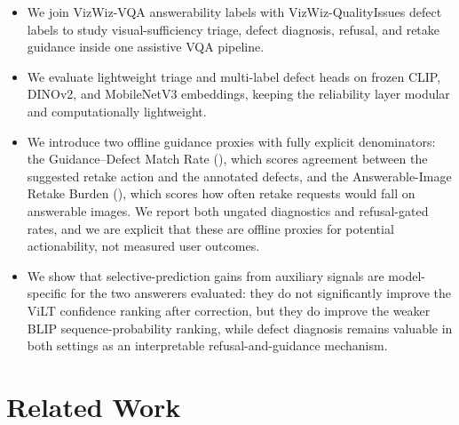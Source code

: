 \documentclass{ieeeaccess}
\newcommand{\arr}{\mathrm{GDMR}}
\newcommand{\frr}{\mathrm{AIRB}}
\newcommand{\clip}{CLIP}
\newcommand{\dinov}{DINOv2}
\newcommand{\mobilenet}{MobileNetV3}
\newcommand{\vilt}{ViLT}
\newcommand{\blip}{BLIP}
\begin{document}
\begin{itemize}
    \item We join VizWiz-VQA answerability labels with VizWiz-QualityIssues defect labels to study visual-sufficiency triage, defect diagnosis, refusal, and retake guidance inside one assistive VQA pipeline.
    \item We evaluate lightweight triage and multi-label defect heads on frozen \clip{}, \dinov{}, and \mobilenet{} embeddings, keeping the reliability layer modular and computationally lightweight.
    \item We introduce two offline guidance proxies with fully explicit denominators: the Guidance--Defect Match Rate (\arr{}), which scores agreement between the suggested retake action and the annotated defects, and the Answerable-Image Retake Burden (\frr{}), which scores how often retake requests would fall on answerable images. We report both ungated diagnostics and refusal-gated rates, and we are explicit that these are offline proxies for potential actionability, not measured user outcomes.
    \item We show that selective-prediction gains from auxiliary signals are model-specific for the two answerers evaluated: they do not significantly improve the \vilt{} confidence ranking after correction, but they do improve the weaker \blip{} sequence-probability ranking, while defect diagnosis remains valuable in both settings as an interpretable refusal-and-guidance mechanism.
\end{itemize}

\section{Related Work}
\label{sec:related}
\end{document}
